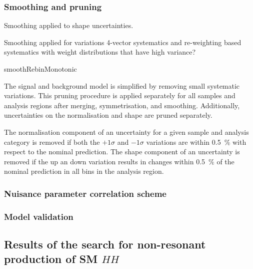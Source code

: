 \subsubsection{Smoothing and pruning}

Smoothing applied to shape uncertainties.

Smoothing applied for variations 4-vector systematics and re-weighting
based systematics with weight distributions that have high variance?

smoothRebinMonotonic


The signal and background model is simplified by removing small
systematic variations. This pruning procedure is applied separately
for all samples and analysis regions after merging, symmetrisation,
and smoothing. Additionally, uncertainties on the normalisation and
shape are pruned separately.

The normalisation component of an uncertainty for a given sample and
analysis category is removed if both the $+1\sigma$ and $-1\sigma$
variations are within \SI{0.5}{\percent} with respect to the nominal
prediction. The shape component of an uncertainty is removed if the up
an down variation results in changes within \SI{0.5}{\percent} of the
nominal prediction in all bins in the analysis region.


\subsubsection{Nuisance parameter correlation scheme}
\subsubsection{Model validation}





\subsection{Results of the search for non-resonant production of SM $HH$}
\label{sec:results_nonres}


